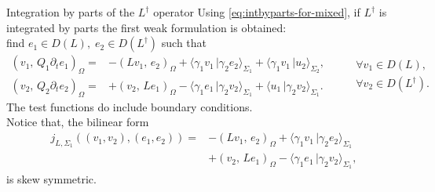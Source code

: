 \documentclass[aspectratio=169]{beamer}
\newcommand{\inner}[3][]{\ensuremath{( #2, \, #3 )_{#1}}}
\newcommand{\dualpr}[3][]{\ensuremath{\langle #2 \, \vert #3 \rangle_{#1}}}
\begin{document}
\begin{frame}{Integration by parts of the $L^\dag$ operator}
	Using \eqref{eq:intbyparts-for-mixed}, if $L^\dag$ is integrated by parts the first weak formulation is obtained: \\
	find $e_1 \in D(L), \; e_2 \in D(L^\dag)$ such that
	\begin{equation*}
		\begin{aligned}
			\inner[\Omega]{v_1}{Q_1 \partial_t e_1} = &-\inner[\Omega]{L v_1}{e_2} + \dualpr[\Sigma_1]{\gamma_1 v_1}{\gamma_2 e_2} + \dualpr[\Sigma_2]{\gamma_1 v_1}{u_2}, \\
			\inner[\Omega]{v_2}{Q_2 \partial_t e_2} = &+\inner[\Omega]{v_2}{L e_1} - \dualpr[\Sigma_1]{\gamma_1 e_1}{\gamma_2 v_2} + \dualpr[\Sigma_1]{u_1}{\gamma_2 v_2}.
		\end{aligned} \qquad
		\begin{aligned}
		\forall v_1 \in D(L), \\
	    \forall v_2 \in D(L^\dag).
		\end{aligned}
	\end{equation*}
	The test functions do include boundary conditions. \\
	Notice that, the bilinear form 
	\begin{equation*}
		\begin{aligned}
			j_{L, \Sigma_1}( (v_1, v_2), (e_1, e_2)) = &-\inner[\Omega]{L v_1}{e_2} + \dualpr[\Sigma_1]{\gamma_1 v_1}{\gamma_2 e_2} \\
			&+\inner[\Omega]{v_2}{L e_1} - \dualpr[\Sigma_1]{\gamma_1 e_1}{\gamma_2 v_2},
		\end{aligned}
	\end{equation*}
	is  skew symmetric. 
\end{frame}
\end{document}
